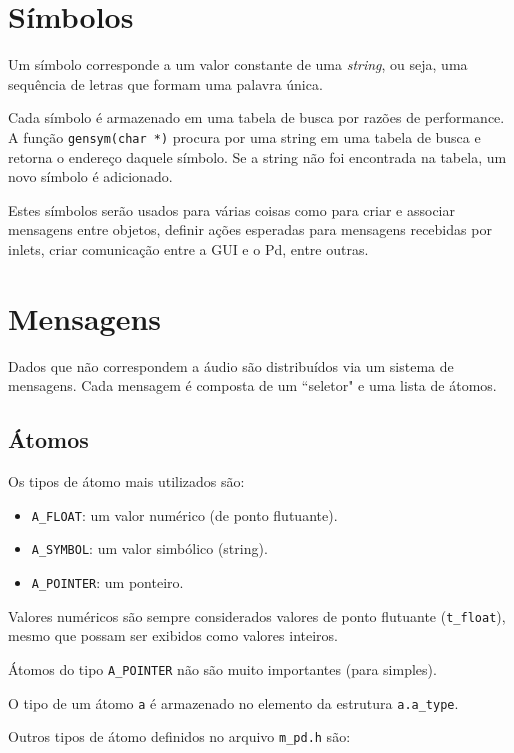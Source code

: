 \section{Símbolos}

Um símbolo corresponde a um valor constante de uma \emph{string}, ou seja,
uma sequência de letras que formam uma palavra única.

Cada símbolo é armazenado em uma tabela de busca por razões de performance. A
função \texttt{gensym(char *)} procura por uma string em uma tabela de busca e
retorna o endereço daquele símbolo. Se a string não foi encontrada na tabela,
um novo símbolo é adicionado.

Estes símbolos serão usados para várias coisas como para criar e associar mensagens 
entre objetos, definir ações esperadas para mensagens recebidas por inlets, criar 
comunicação entre a GUI e o Pd, entre outras.
\section{Mensagens}
\label{sec:mensagens}

Dados que não correspondem a áudio são distribuídos via um sistema de
mensagens. Cada mensagem é composta de um ``seletor" e uma lista de átomos.

\subsection{Átomos}
\label{sec:atomos}

Os tipos de átomo mais utilizados são:

\begin{itemize}
\item \texttt{A\_FLOAT}: um valor numérico (de ponto flutuante).
\item \texttt{A\_SYMBOL}: um valor simbólico (string).
\item \texttt{A\_POINTER}: um ponteiro.
\end{itemize}

Valores numéricos são sempre considerados valores de ponto flutuante
(\texttt{t\_float}), mesmo que possam ser exibidos como valores inteiros.

Átomos do tipo \texttt{A\_POINTER} não são muito importantes (para \externals
simples).

O tipo de um átomo \texttt{a} é armazenado no elemento da estrutura
\texttt{a.a\_type}.

Outros tipos de átomo definidos no arquivo \texttt{m\_pd.h} são:

